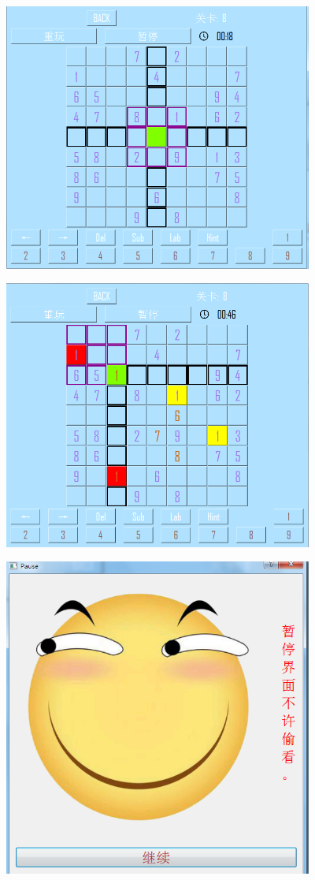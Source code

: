 \documentclass[hyperref,UTF8]{ctexart}
\begin{document}
\begin{center}
\includegraphics[width=4in]{click.PNG}
\end{center}

\begin{center}
\includegraphics[width=4in]{same.PNG}
\end{center}

\begin{center}
\includegraphics[width=4in]{pause.PNG}
\end{center}
\end{document}
